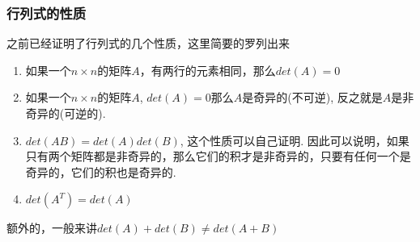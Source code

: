 \subsubsection{行列式的性质}
之前已经证明了行列式的几个性质，这里简要的罗列出来
\begin{enumerate}
\item 如果一个$n\times n$的矩阵$A$，有两行的元素相同，那么$det(A) = 0$
\item 如果一个$n\times n$的矩阵$A$, $det(A) = 0$那么$A$是奇异的(不可逆), 反之就是$A$是非奇异的(可逆的).
\item $det(AB) = det(A)det(B)$, 这个性质可以自己证明. 因此可以说明，如果只有两个矩阵都是非奇异的，那么它们的积才是非奇异的，只要有任何一个是奇异的，它们的积也是奇异的.
\item $det(A^T) = det(A)$
\end{enumerate}

额外的，一般来讲$det(A) + det(B) \neq det(A + B)$





